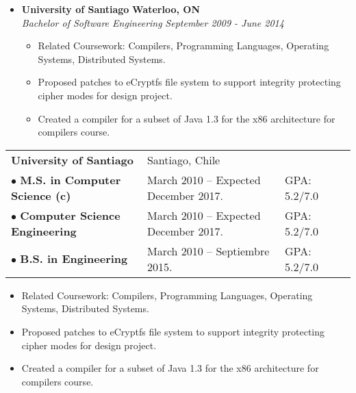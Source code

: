 \documentclass[10pt,letterpaper]{article}
\begin{document}
  \begin{itemize}[leftmargin=*]
    \parskip=-0.5em

    \item[]
    {\textbf{University of Santiago} \hfill
     \textbf{Waterloo, ON}
    }
    \\
    {\emph{Bachelor of Software Engineering} \hfill
      \emph{September 2009 - June 2014}}

    \begin{itemize}[label=\textbullet]
      \item Related Coursework: Compilers, Programming Languages, Operating
        Systems, Distributed Systems.
      \item Proposed patches to eCryptfs file system to support
        integrity protecting cipher modes for design project.
      \item Created a compiler for a subset of Java 1.3 for the
        x86 architecture for compilers course.
    \end{itemize}
  \end{itemize}

\begin{tabular}{lllc}	
	\textbf{University of Santiago}&Santiago, Chile& & \\
	$\bullet$  \textbf{M.S. in Computer Science (c)}& March 2010 – Expected December 2017. & GPA: 5.2/7.0 & \\
	$\bullet$  \textbf{Computer Science Engineering} & March 2010 – Expected December 2017. & GPA: 5.2/7.0 & \\
	$\bullet$  \textbf{B.S. in Engineering} & March 2010 – Septiembre 2015. & GPA: 5.2/7.0  &\\
\end{tabular}

\begin{itemize}[label=\textbullet]
	\item Related Coursework: Compilers, Programming Languages, Operating
	Systems, Distributed Systems.
	\item Proposed patches to eCryptfs file system to support
	integrity protecting cipher modes for design project.
	\item Created a compiler for a subset of Java 1.3 for the
	x86 architecture for compilers course.
\end{itemize}
\end{document}
